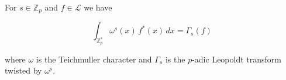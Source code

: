 For $s \in \mathbb{Z}_p$ and $f \in \mathcal{L}$ we have

$$\int_{\mathbb{Z}_p^*} \omega^s(x) \, f^*(x) \, dx = \Gamma_s(f)$$

where $\omega$ is the Teichmuller character and $\Gamma_s$ is the $p$-adic Leopoldt transform twisted by $\omega^s$.

